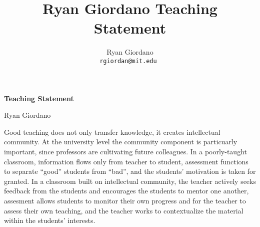 

\usepackage{enumitem}

\usepackage{geometry}
\geometry{top=0.9in}
\geometry{left=1.4in}
\geometry{right=1.4in}


\title{Ryan Giordano Teaching Statement}

\author{
  Ryan Giordano \\ \texttt{rgiordan@mit.edu }
}




\begin{minipage}[t]{0.5\textwidth}
\hspace{-2em} %
{\bf \LARGE Teaching Statement}\\
\end{minipage}
\begin{minipage}[t]{0.5\textwidth}
        \hspace{8em} %
        {\LARGE Ryan Giordano}
\end{minipage}

Good teaching does not only transfer knowledge, it creates intellectual
community. At the university level the community component is particuarly
important, since professors are cultivating future colleagues.  In a
poorly-taught classroom, information flows only from teacher to student,
assessment functions to separate ``good'' students from ``bad'', and the
students' motivation is taken for granted.  In a classroom built on intellectual
community, the teacher actively seeks feedback from the students and encourages
the students to mentor one another, assesment allows students to monitor their
own progress and for the teacher to assess their own teaching, and the teacher
works to contextualize the material within the students' interests.

